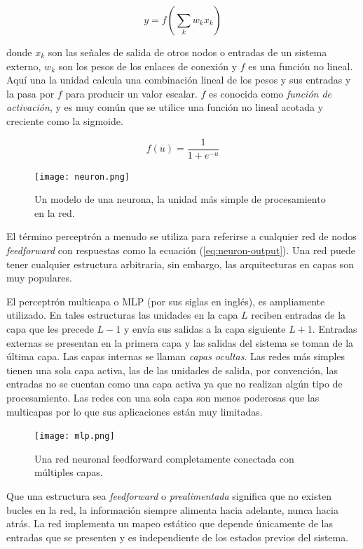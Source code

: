 \begin{equation}\label{eq:neuron-output}
y = f(\sum_k w_k x_k)    
\end{equation}

donde $x_k$ son las señales de salida de otros nodos o entradas de un sistema
externo, $w_k$ son los pesos de los enlaces de conexión y $f$ es una función
no lineal. Aquí una la unidad calcula una combinación lineal de los pesos y sus
entradas y la pasa por $f$ para producir un valor escalar. 
$f$ es conocida como \textit{función de activación}, y es muy común que
se utilice una función no lineal acotada y creciente como la sigmoide.

\[
f(u) = \frac{1}{1 + e^{-u}}
\]

\begin{figure}
    \centering
    \texttt{[image: neuron.png]}
    \caption{Un modelo de una neurona, la unidad más simple de procesamiento en la red.}
    \label{fig:neuron}
\end{figure}
El término perceptrón a menudo se utiliza para referirse a cualquier
red de nodos \textit{feedforward} con respuestas como la ecuación (\ref{eq:neuron-output}).
Una red puede tener cualquier estructura arbitraria, sin embargo, 
las arquitecturas en capas son muy populares.\\

\begin{remark}
El perceptrón
multicapa o MLP (por sus siglas en inglés), es ampliamente utilizado.
En tales estructuras las unidades en la capa $L$ reciben entradas de la capa
que les precede $L-1$ y envía sus salidas a la capa siguiente $L+1$. Entradas
externas se presentan en la primera capa y las salidas del sistema se toman
de la última capa. Las capas internas se llaman \textit{capas ocultas}. Las redes
más simples tienen una sola capa activa, las de las unidades de salida, por convención, las entradas no se cuentan como una capa activa ya que no realizan
algún tipo de procesamiento. Las redes con una sola capa son menos 
poderosas que las multicapas por lo que sus aplicaciones están
muy limitadas.
\end{remark}

\begin{figure}
    \centering
    \texttt{[image: mlp.png]}
    \caption{Una red neuronal feedforward completamente conectada con múltiples capas.}
    \label{fig:mpl}
\end{figure}

Que una estructura sea \textit{feedforward} o \textit{prealimentada} significa 
que no existen bucles en la red, la información siempre alimenta
hacia adelante, nunca hacia atrás. La red implementa un
mapeo estático que depende únicamente de las entradas que se presenten y es 
independiente de los estados previos del sistema.\\

